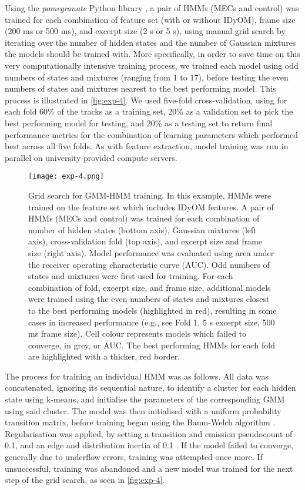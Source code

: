 Using the \emph{pomegranate} Python library \parencite{schreiber2018}, a pair of HMMs (MECs and control) was trained for each combination of feature set (with or without IDyOM), frame size (200 ms or 500 ms), and excerpt size (2 s or 5 s), using manual grid search by iterating over the number of hidden states and the number of Gaussian mixtures the models should be trained with. More specifically, in order to save time on this very computationally intensive training process, we trained each model using odd numbers of states and mixtures (ranging from 1 to 17), before testing the even numbers of states and mixtures nearest to the best performing model. This process is illustrated in \autoref{fig:exp-4}. We used five-fold cross-validation, using for each fold 60\% of the tracks as a training set, 20\% as a validation set to pick the best performing model for testing, and 20\% as a testing set to return final performance metrics for the combination of learning parameters which performed best across all five folds. As with feature extraction, model training was run in parallel on university-provided compute servers.

\begin{figure}[t!]
\texttt{[image: exp-4.png]}
\centering
\caption{Grid search for GMM-HMM training. In this example, HMMs were trained on the feature set which includes IDyOM features. A pair of HMMs (MECs and control) was trained for each combination of number of hidden states (bottom axis), Gaussian mixtures (left axis), cross-validation fold (top axis), and excerpt size and frame size (right axis). Model performance was evaluated using area under the receiver operating characteristic curve (AUC). Odd numbers of states and mixtures were first used for training. For each combination of fold, excerpt size, and frame size, additional models were trained using the even numbers of states and mixtures closest to the best performing models (highlighted in red), resulting in some cases in increased performance (e.g., see Fold 1, 5 s excerpt size, 500 ms frame size). Cell colour represents models which failed to converge, in grey, or AUC. The best performing HMMs for each fold are highlighted with a thicker, red border.}
\label{fig:exp-4}
\end{figure}

The process for training an individual HMM was as follows. All data was concatenated, ignoring its sequential nature, to identify a cluster for each hidden state using k-means, and initialise the parameters of the corresponding GMM using said cluster. The model was then initialised with a uniform probability transition matrix, before training began using the Baum-Welch algorithm \parencite[see][]{jurafsky2021}. Regularisation was applied, by setting a transition and emission pseudocount of 0.1, and an edge and distribution inertia of 0.1 \parencite[see][]{schreiber2018}. If the model failed to converge, generally due to underflow errors, training was attempted once more. If unsuccessful, training was abandoned and a new model was trained for the next step of the grid search, as seen in \autoref{fig:exp-4}.

